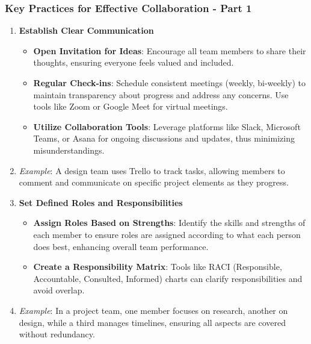 \documentclass[aspectratio=169]{beamer}
\begin{document}
\begin{frame}[fragile]
    \frametitle{Key Practices for Effective Collaboration - Part 1}
    \begin{enumerate}
        \item \textbf{Establish Clear Communication}
            \begin{itemize}
                \item \textbf{Open Invitation for Ideas}: Encourage all team members to share their thoughts, ensuring everyone feels valued and included.
                \item \textbf{Regular Check-ins}: Schedule consistent meetings (weekly, bi-weekly) to maintain transparency about progress and address any concerns. Use tools like Zoom or Google Meet for virtual meetings.
                \item \textbf{Utilize Collaboration Tools}: Leverage platforms like Slack, Microsoft Teams, or Asana for ongoing discussions and updates, thus minimizing misunderstandings.
            \end{itemize}
            \item \textit{Example}: A design team uses Trello to track tasks, allowing members to comment and communicate on specific project elements as they progress.
 
        \item \textbf{Set Defined Roles and Responsibilities}
            \begin{itemize}
                \item \textbf{Assign Roles Based on Strengths}: Identify the skills and strengths of each member to ensure roles are assigned according to what each person does best, enhancing overall team performance.
                \item \textbf{Create a Responsibility Matrix}: Tools like RACI (Responsible, Accountable, Consulted, Informed) charts can clarify responsibilities and avoid overlap.
            \end{itemize}
            \item \textit{Example}: In a project team, one member focuses on research, another on design, while a third manages timelines, ensuring all aspects are covered without redundancy.
    \end{enumerate}
\end{frame}
\end{document}
